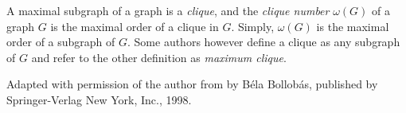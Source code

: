 \documentclass[12pt]{article}
\begin{document}
A maximal  subgraph of a graph is a \emph{clique}, and the \emph{clique number} $\omega(G)$ of a graph $G$ is the  maximal order of a clique in $G$. Simply, $\omega(G)$ is the maximal order of a  subgraph of $G$. Some authors however define a clique as any  subgraph of $G$ and refer to the other definition as \textit{maximum clique}.


\footnotesize{Adapted with permission of the author from \emph{} by B\'{e}la Bollob\'{a}s, published by Springer-Verlag New York, Inc., 1998.}
\end{document}
